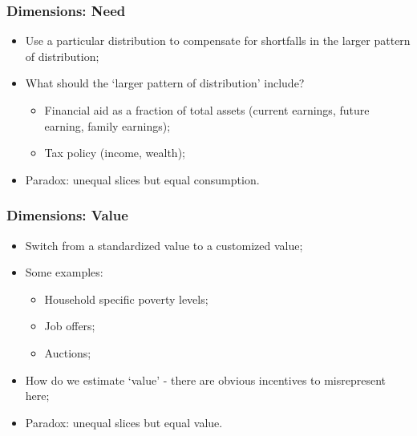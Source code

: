 \documentclass[aspectratio=169]{beamer}
\theoremstyle{principle}
\begin{document}
\begin{frame}
\frametitle{Dimensions: Need}

\begin{itemize}
\item Use a particular distribution to compensate for shortfalls in the larger pattern of distribution;
\bigskip
\bigskip
\item What should the `larger pattern of distribution' include?
\begin{itemize}
\item Financial aid as a fraction of total assets (current earnings, future earning, family earnings);
\item Tax policy (income, wealth);
\end{itemize} 
\bigskip
\bigskip
\item Paradox: unequal slices but equal consumption.
\end{itemize}

\end{frame}

\begin{frame}
\frametitle{Dimensions: Value}

\begin{itemize}
\item Switch from a standardized value to a customized value;
\bigskip
\bigskip
\item Some examples:
\begin{itemize}
\item Household specific poverty levels;
\item Job offers;
\item Auctions;
\end{itemize}
\bigskip
\bigskip
\item How do we estimate `value' - there are obvious incentives to misrepresent here;
\bigskip
\bigskip
\item Paradox: unequal slices but equal value.
\end{itemize}

\end{frame}
\end{document}
